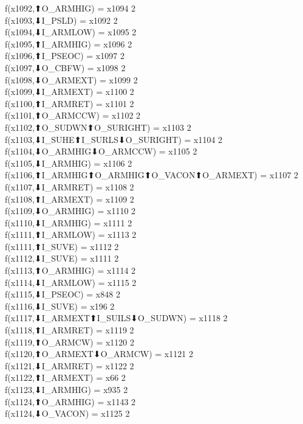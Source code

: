 f(x1092,⬆O_ARMHIG) = x1094 {2} \\
f(x1093,⬇I_PSLD) = x1092 {2} \\
f(x1094,⬇I_ARMLOW) = x1095 {2} \\
f(x1095,⬆I_ARMHIG) = x1096 {2} \\
f(x1096,⬆I_PSEOC) = x1097 {2} \\
f(x1097,⬇O_CBFW) = x1098 {2} \\
f(x1098,⬇O_ARMEXT) = x1099 {2} \\
f(x1099,⬇I_ARMEXT) = x1100 {2} \\
f(x1100,⬆I_ARMRET) = x1101 {2} \\
f(x1101,⬆O_ARMCCW) = x1102 {2} \\
f(x1102,⬆O_SUDWN⬆O_SURIGHT) = x1103 {2} \\
f(x1103,⬇I_SUHE⬆I_SURLS⬇O_SURIGHT) = x1104 {2} \\
f(x1104,⬇O_ARMHIG⬇O_ARMCCW) = x1105 {2} \\
f(x1105,⬇I_ARMHIG) = x1106 {2} \\
f(x1106,⬆I_ARMHIG⬆O_ARMHIG⬆O_VACON⬆O_ARMEXT) = x1107 {2} \\
f(x1107,⬇I_ARMRET) = x1108 {2} \\
f(x1108,⬆I_ARMEXT) = x1109 {2} \\
f(x1109,⬇O_ARMHIG) = x1110 {2} \\
f(x1110,⬇I_ARMHIG) = x1111 {2} \\
f(x1111,⬆I_ARMLOW) = x1113 {2} \\
f(x1111,⬆I_SUVE) = x1112 {2} \\
f(x1112,⬇I_SUVE) = x1111 {2} \\
f(x1113,⬆O_ARMHIG) = x1114 {2} \\
f(x1114,⬇I_ARMLOW) = x1115 {2} \\
f(x1115,⬇I_PSEOC) = x848 {2} \\
f(x1116,⬇I_SUVE) = x196 {2} \\
f(x1117,⬇I_ARMEXT⬆I_SUILS⬇O_SUDWN) = x1118 {2} \\
f(x1118,⬆I_ARMRET) = x1119 {2} \\
f(x1119,⬆O_ARMCW) = x1120 {2} \\
f(x1120,⬆O_ARMEXT⬇O_ARMCW) = x1121 {2} \\
f(x1121,⬇I_ARMRET) = x1122 {2} \\
f(x1122,⬆I_ARMEXT) = x66 {2} \\
f(x1123,⬇I_ARMHIG) = x935 {2} \\
f(x1124,⬆O_ARMHIG) = x1143 {2} \\
f(x1124,⬇O_VACON) = x1125 {2} \\
